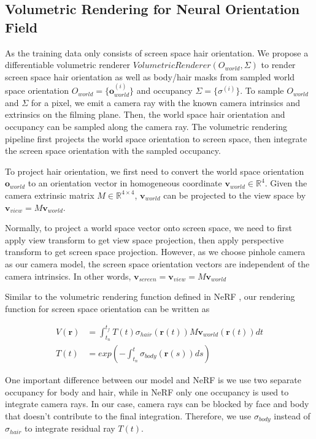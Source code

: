 \documentclass{article}
\begin{document}
\subsection{Volumetric Rendering for Neural Orientation Field}

As the training data only consists of screen space hair orientation. We propose a differentiable volumetric renderer $VolumetricRenderer(O_{world}, \Sigma)$ to render screen space hair orientation as well as body/hair masks from sampled world space orientation $O_{world} = \{ \mathbf{o}_{world}^{(i)} \}$ and occupancy $\Sigma = \{ \sigma^{(i)} \}$. To sample $O_{world}$ and $\Sigma$ for a pixel, we emit a camera ray with the known camera intrinsics and extrinsics on the filming plane. Then, the world space hair orientation and occupancy can be sampled along the camera ray. The volumetric rendering pipeline first projects the world space orientation to screen space, then integrate the screen space orientation with the sampled occupancy.

To project hair orientation, we first need to convert the world space orientation $\mathbf{o}_{world}$ to an orientation vector in homogeneous coordinate $\mathbf{v}_{world} \in \mathbb{R}^{4}$. Given the camera extrinsic matrix $M \in \mathbb{R}^{4 \times 4}$, $\mathbf{v}_{world}$ can be projected to the view space by $\mathbf{v}_{view} = M\mathbf{v}_{world}$.

Normally, to project a world space vector onto screen space, we need to first apply view transform to get view space projection, then apply perspective transform to get screen space projection. However, as we choose pinhole camera as our camera model, the screen space orientation vectors are independent of the camera intrinsics. In other words, $\mathbf{v}_{screen} = \mathbf{v}_{view} = M\mathbf{v}_{world}$

Similar to the volumetric rendering function defined in NeRF \cite{mildenhall_nerf_2020}, our rendering function for screen space orientation can be written as

\begin{align}
	V(\mathbf{r}) & = \int_{t_{n}}^{t_{f}} T(t) \sigma_{hair}(\mathbf{r}(t)) M \mathbf{v}_{world}(\mathbf{r}(t)) dt \\
	T(t) & = exp(-\int_{t_{n}}^{t} \sigma_{body}(\mathbf{r}(s)) ds)
\end{align}

One important difference between our model and NeRF is we use two separate occupancy for body and hair, while in NeRF only one occupancy is used to integrate camera rays. In our case, camera rays can be blocked by face and body that doesn't contribute to the final integration. Therefore, we use $\sigma_{body}$ instead of $\sigma_{hair}$ to integrate residual ray $T(t)$.
\end{document}
